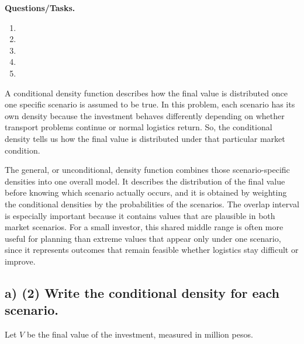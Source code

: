 	\textbf{Questions/Tasks.}
	\begin{enumerate}[label=\textbf{\alph*)}]
		\item {}
		\item {}
		\item {}
		\item {}
		\item {}
	\end{enumerate}
	
	A conditional density function describes how the final value is distributed once one specific scenario is assumed to be true. In this problem, each scenario has its own density because the investment behaves differently depending on whether transport problems continue or normal logistics return. So, the conditional density tells us how the final value is distributed under that particular market condition.
	
	The general, or unconditional, density function combines those scenario-specific densities into one overall model. It describes the distribution of the final value before knowing which scenario actually occurs, and it is obtained by weighting the conditional densities by the probabilities of the scenarios. The overlap interval is especially important because it contains values that are plausible in both market scenarios. For a small investor, this shared middle range is often more useful for planning than extreme values that appear only under one scenario, since it represents outcomes that remain feasible whether logistics stay difficult or improve.
	
	\subsection*{a) \textbf{(2)} Write the conditional density for each scenario.}
	\label{subsec:two-scenario-inventory-investment-c2-a}
	Let $V$ be the final value of the investment, measured in million pesos.
	
